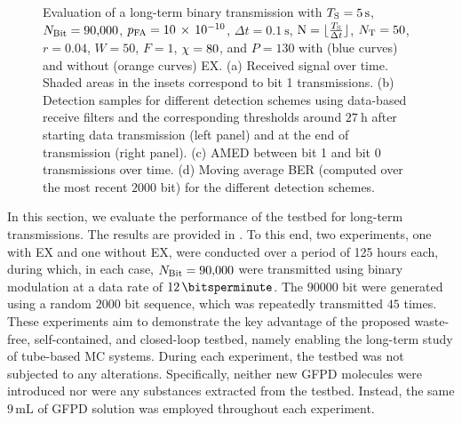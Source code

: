 \begin{figure}[!tbp]
    \caption{Evaluation of a long-term binary transmission with $\Ts = \SI{5}{\s}$, $N_{\mathrm{Bit}} = \num{90000}$, $p_\mathrm{FA} = 10 \, \times \, 10^{-10}$, $\Delta t = \SI{0.1}{\s} $, $\mathrm{N} = \lfloor \frac{T_{\mathrm{S}}}{\Delta t} \rfloor$, $N_\mathrm{T} = 50$, $r = 0.04$, $W = 50$, $F = 1$, $\chi = 80$, and $P = 130$ with (blue curves) and without (orange curves) \ac{EX}. (a) Received signal over time. Shaded areas in the insets correspond to bit 1 transmissions. (b) Detection samples for different detection schemes using data-based receive filters and the corresponding thresholds around $\SI{27}{\hour}$ after starting data transmission (left panel) and at the end of transmission (right panel). (c) \ac{AMED} between bit 1 and bit 0 transmissions over time. (d) Moving average \ac{BER} (computed over the most recent $\num{2000}$ bit) for the different detection schemes. }
    \label{fig:longterm}
    \vspace*{-5mm}
\end{figure}
%
In this section, we evaluate the performance of the testbed for long-term transmissions. The results are provided in . To this end, two experiments, one with \ac{EX} and one without \ac{EX}, were conducted over a period of 125 hours each, during which, in each case, $N_{\mathrm{Bit}} = \num{90000}$ were transmitted using binary modulation at a data rate of $\SI{12}{\bitsperminute}$. The $\num{90000}$ bit were generated using a random $\num{2000}$ bit sequence, which was repeatedly transmitted $45$ times. These experiments aim to demonstrate the key advantage of the proposed waste-free, self-contained, and closed-loop testbed, namely enabling the long-term study of tube-based MC systems. During each experiment, the testbed was not subjected to any alterations. Specifically, neither new \ac{GFPD} molecules were introduced nor were any substances extracted from the testbed. Instead, the same $9 \,\si{\milli\liter}$ of \ac{GFPD} solution was employed throughout each experiment.
%
\scaleSubsubsection
